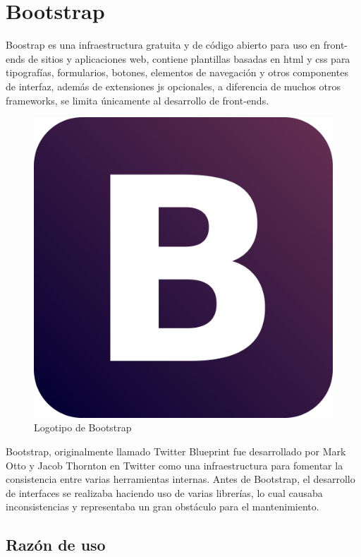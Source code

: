 \section{Bootstrap}

Boostrap\cite{Bootstrap} es una infraestructura gratuita y de código abierto para uso en front-ends de sitios y aplicaciones web, contiene plantillas basadas en \acrshort{html} y \acrshort{css} para tipografías, formularios, botones, elementos de navegación y otros componentes de interfaz, además de extensiones \acrfull{js} opcionales, a diferencia de muchos otros frameworks, se limita únicamente al desarrollo de front-ends.

\begin{figure}[!htbp]
	\centering
	\includegraphics[scale=0.50]{fig/bootstrap_logo}
	\caption{Logotipo de Bootstrap}
\end{figure}

Bootstrap, originalmente llamado Twitter Blueprint fue desarrollado por Mark Otto y Jacob Thornton en Twitter como una infraestructura para fomentar la consistencia entre varias herramientas internas. Antes de Bootstrap, el desarrollo de interfaces se realizaba haciendo uso de varias librerías, lo cual causaba inconsistencias y representaba un gran obstáculo para el mantenimiento.

\subsection{Razón de uso}

